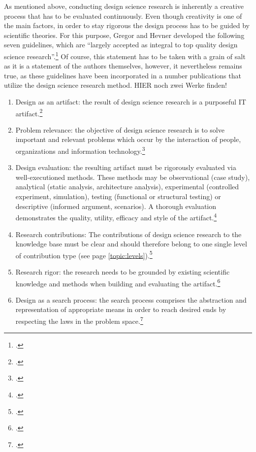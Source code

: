 As mentioned above, conducting design science research is inherently a creative process that has to be evaluated continuously. Even though creativity is one of the main factors, in order to stay rigorous the design process has to be guided by scientific theories. For this purpose, Gregor and Hevner developed the following seven guidelines, which are \enquote{largely accepted as integral to top quality design science research}.\footcite[p.19]{HevnerDesignResearchInformation2010} Of course, this statement has to be taken with a grain of salt as it is a statement of the authors themselves, however, it nevertheless remains true, as these guidelines have been incorporated in a number publications that utilize the design science research method. HIER noch zwei Werke finden!
\begin{enumerate}
    \item Design as an artifact: the result of design science research is a purposeful IT artifact.\footcites[Cf.][p.82]{HevnerDesignScienceResearch2004}[cf.][p.viii]{WeberEditorCommentsStill2003}
    \item Problem relevance: the objective of design science research is to solve important and relevant problems which occur by the interaction of people, organizations and information technology.\footcite[Cf.][pp.82,83]{HevnerDesignScienceResearch2004}
    \item Design evaluation: the resulting artifact must be rigorously evaluated via well-executioned methods. These methods may be observational (case study), analytical (static analysis, architecture analysis), experimental (controlled experiment, simulation), testing (functional or structural testing) or descriptive (informed argument, scenarios). A thorough evaluation demonstrates the quality, utility, efficacy and style of the artifact.\footcite[Cf.][pp.83-86]{HevnerDesignScienceResearch2004}
    \item Research contributions: The contributions of design science research to the knowledge base must be clear and should therefore belong to one single level of contribution type (see page \ref{topic:levels}).\footcite[Cf.][pp.83,87]{HevnerDesignScienceResearch2004}
    \item Research rigor: the research needs to be grounded by existing scientific knowledge and methods when building and evaluating the artifact.\footcite[Cf.][p.83]{HevnerDesignScienceResearch2004}
    \item Design as a search process: the search process comprises the abstraction and representation of appropriate means in order to reach desired ends by respecting the laws in the problem space.\footcite[Cf.][pp.83,88-89]{HevnerDesignScienceResearch2004}

\end{enumerate}
